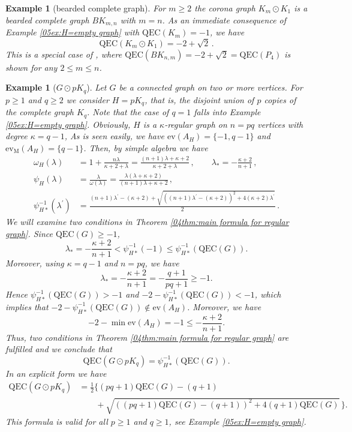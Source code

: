 \documentclass[12pt,a4paper]{article}
\newtheorem{example}[theorem]{Example}
\newcommand{\1}{{\bm 1}}
\numberwithin{equation}{section}
\begin{document}
\begin{example}[bearded complete graph]
\label{05ex:bearded complete graph}
\normalfont
For $m\ge2$ the corona graph $K_m\odot K_1$ is a 
bearded complete graph $BK_{m,n}$ with $m=n$.
As an immediate consequence of
Example \ref{05ex:H=empty graph} with $\mathrm{QEC}(K_m)=-1$,
we have
\[
\mathrm{QEC}(K_m\odot K_1)
=-2+\sqrt2\,.
\]
This is a special case of \cite[Theorem 4.3]{Baskoro-Obata2021},
where $\mathrm{QEC}(BK_{n,m})=-2+\sqrt2=\mathrm{QEC}(P_4)$ is shown
for any $2\le m\le n$.
\end{example}

\begin{example}[$G\odot pK_q$]
\label{05ex:H=pKq}\normalfont
Let $G$ be a connected graph on two or more vertices.
For $p\ge1$ and $q\ge2$
we consider $H=pK_q$, that is, the disjoint union of 
$p$ copies of the complete graph $K_q$.
Note that the case of $q=1$ falls into Example
\ref{05ex:H=empty graph}.
Obviously, $H$ is a $\kappa$-regular graph on $n=pq$ vertices
with degree $\kappa=q-1$,
As is seen easily, we have
$\mathrm{ev}(A_H)=\{-1,q-1\}$ and
$\mathrm{ev}_{\mathrm{M}}(A_H)=\{q-1\}$.
Then, by simple algebra we have
%
\begin{align*}
\omega_H(\lambda)
&=1+\frac{n\lambda}{\kappa+2+\lambda}
=\frac{(n+1)\lambda+\kappa+2}{\kappa+2+\lambda}\,,
\qquad \lambda_*=-\frac{\kappa+2}{n+1}\,,
\\[6pt]
\psi_H(\lambda)
&=\frac{\lambda}{\omega(\lambda)}
=\frac{\lambda(\lambda+\kappa+2)}{(n+1)\lambda+\kappa+2}\,,
\\[6pt]
\psi_{H*}^{-1}(\lambda^\prime)
&=\frac{
(n+1)\lambda^\prime-(\kappa+2)
+\sqrt{((n+1)\lambda^\prime-(\kappa+2))^2
 +4(\kappa+2)\lambda^\prime}}{2}\,.
\end{align*}
%
We will examine two conditions 
in Theorem \ref{04thm:main formula for regular graph}.
Since $\mathrm{QEC}(G)\ge-1$,
\[
\lambda_*=-\frac{\kappa+2}{n+1}
<\psi_{H*}^{-1}(-1)\le \psi_{H*}^{-1}(\mathrm{QEC}(G)).
\]
Moreover, using $\kappa=q-1$ and $n=pq$, we have
\[
\lambda_*=-\frac{\kappa+2}{n+1}
=-\frac{q+1}{pq+1}\ge-1.
\]
Hence $\psi_{H*}^{-1}(\mathrm{QEC}(G))>-1$ and 
$-2-\psi_{H*}^{-1}(\mathrm{QEC}(G))<-1$,
which implies that
$-2-\psi_{H*}^{-1}(\mathrm{QEC}(G))\not\in\mathrm{ev}(A_H)$.
Moreover, we have 
\[
-2-\min\mathrm{ev}(A_H)=-1
\le -\frac{\kappa+2}{n+1}.
\]
Thus, two conditions in
Theorem \ref{04thm:main formula for regular graph}
are fulfilled and we conclude that
\[
\mathrm{QEC}(G\odot pK_q)
=\psi_{H*}^{-1}(\mathrm{QEC}(G)).
\]
In an explicit form we have
\begin{align*}
\mathrm{QEC}(G\odot pK_q)
&=\frac{1}{2} \Big\{(pq+1)\mathrm{QEC}(G)-(q+1)
\\
&\qquad 
+\sqrt{((pq+1)\mathrm{QEC}(G)-(q+1))^2+4(q+1)\mathrm{QEC}(G)}\,\Big\}.
\end{align*}
This formula is valid for all $p\ge1$ and $q\ge1$, 
see Example \ref{05ex:H=empty graph}.
\end{example}
\end{document}
